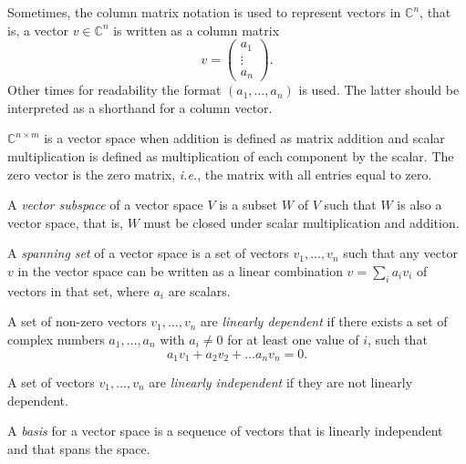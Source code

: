 Sometimes, the column matrix notation is used to represent vectors in $\mathbb{C}^{n}$, that is, a vector $v \in \mathbb{C}^{n}$ is written as a column matrix $$v = \begin{pmatrix} a_1 \\ \vdots \\ a_n \end{pmatrix}.$$ Other times for readability the format $(a_1, \ldots , a_n)$ is used. The latter should be interpreted as a shorthand for a column vector.

$\mathbb{C}^{n \times m}$ is a vector space when addition is defined as matrix addition and scalar multiplication is defined as multiplication of each component by the scalar. The zero vector is the zero matrix, \textit{i.e.}, the matrix with all entries equal to zero.

\begin{definition}
A \emph{vector subspace} of a vector space $V$ is a subset $W$ of $V$ such that $W$ is also a vector space, that is, $W$ must be closed under scalar multiplication and addition.
\end{definition}

\begin{definition}
  A \emph{spanning set} of a vector space is a set of vectors $v_{1}, \ldots, v_{n}$ such that any vector $v$ in the vector space can be written as a linear combination $v = \sum_{i} a_{i} v_{i}$ of vectors in that set, where $a_{i}$ are scalars.
\end{definition}

\begin{definition}
A set of non-zero vectors $v_1, \ldots, v_n$ are \emph{linearly dependent} if there exists a set of complex numbers $a_1, \ldots , a_n$ with $a_i \neq 0$ for at least one value of $i$, such that
\begin{equation*}
  a_1 v_1 + a_2 v_2 +\ldots a_n v_n = 0.
\end{equation*}
\end{definition}

\begin{definition}
A set of vectors $v_1, \ldots, v_n$ are \emph{linearly independent} if they are not linearly dependent.
\end{definition}

\begin{definition}
A \emph{basis} for a vector space is a sequence of vectors that is linearly
independent and that spans the space.
\end{definition}

